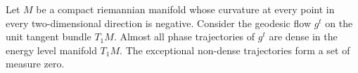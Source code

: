 Let $M$ be a compact riemannian manifold whose curvature at every point in every two-dimensional direction is negative. Consider the geodesic flow $g^t$ on the unit tangent bundle $T_1M$. Almost all phase trajectories of $g^t$ are dense in the energy level manifold $T_1M$. The exceptional non-dense trajectories form a set of measure zero.
